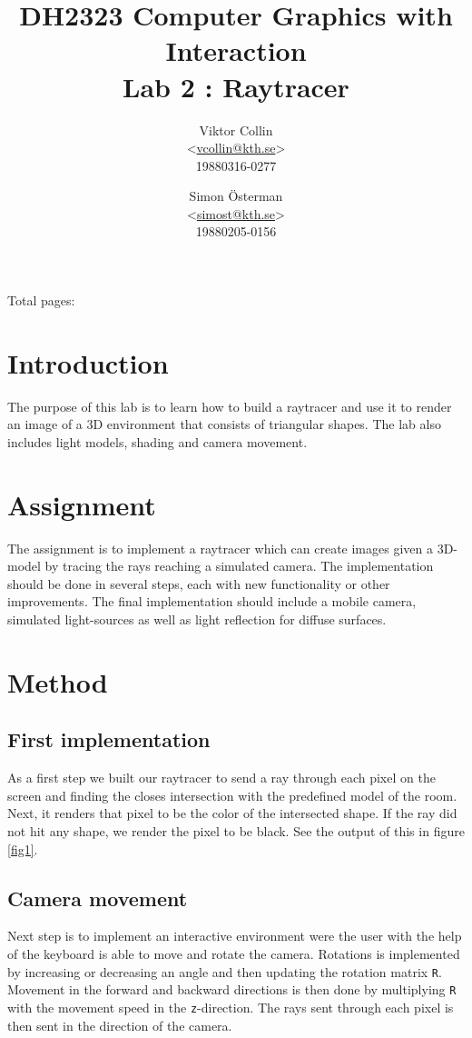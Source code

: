 \documentclass[a4paper,11pt]{article}
\author{Viktor Collin \\ <\url{vcollin@kth.se}> \\ 19880316-0277 \and Simon \"{O}sterman \\ <\url{simost@kth.se}> \\ 19880205-0156}
\title{\textbf{DH2323 Computer Graphics with Interaction \\ Lab 2 : Raytracer}}
\begin{document}
\maketitle
\begin{center}
Total pages: \pageref{LastPage}
\end{center}
\thispagestyle{empty}

\clearpage
\setcounter{page}{1}
\section{Introduction}
The purpose of this lab is to learn how to build a raytracer and use it to render an image of a 3D environment that consists of triangular shapes. The lab also includes light models, shading and camera movement. 
\section{Assignment}
The assignment is to implement a raytracer which can create images given a 3D-model by tracing the rays reaching a simulated camera. The implementation should be done in several steps, each with new functionality or other improvements. The final implementation should include a mobile camera, simulated light-sources as well as light reflection for diffuse surfaces.
\section{Method}
\subsection{First implementation}
As a first step we built our raytracer to send a ray through each pixel on the screen and finding the closes intersection with the predefined model of the room. Next, it renders that pixel to be the color of the intersected shape. If the ray did not hit any shape, we render the pixel to be black. See the output of this in figure \ref{fig1}.

\subsection{Camera movement}
Next step is to implement an interactive environment were the user with the help of the keyboard is able to move and rotate the camera. Rotations is implemented by increasing or decreasing an angle and then updating the rotation matrix \verb|R|. Movement in the forward and backward directions is then done by multiplying \verb|R| with the movement speed in the \verb|z|-direction. The rays sent through each pixel is then sent in the direction of the camera.
\end{document}
